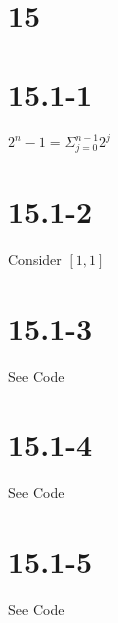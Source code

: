\documentclass[]{article}
\title{}
\author{}
\begin{document}
\maketitle

\begin{abstract}

\end{abstract}

\section{15}

\section{15.1-1}
$2^n -1 = \Sigma_{j = 0}^{n-1} 2^j $
\section{15.1-2}
Consider $[1,1]$

\section{15.1-3}
See Code

\section{15.1-4}
See Code

\section{15.1-5}
See Code
\end{document}
